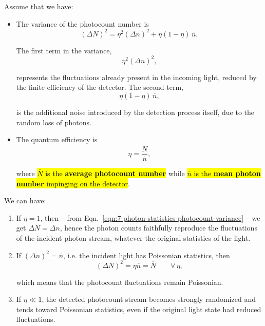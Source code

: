 Assume that we have:
\begin{itemize}
    \item The variance of the photocount number is
    \begin{equation}\label{eqn:7-photon-statistics-photocount-variance}
    (\Delta N)^2 = \eta^2 (\Delta n)^2 + \eta(1-\eta)\,\overline{n},
    \end{equation}

    The first term in the variance,
    \[
    \eta^2 (\Delta n)^2,
    \]

    represents the fluctuations already present in the incoming light, reduced by the finite efficiency of the detector. The second term,
    \[
    \eta(1-\eta)\,\overline{n},
    \]

    is the additional noise introduced by the detection process itself, due to the random loss of photons. 

    \item The quantum efficiency is
    \[
    \eta = \frac{\overline{N}}{\overline{n}},
    \]

    where \hl{$\overline{N}$ is the \textbf{average photocount number}} while \hl{$\overline{n}$ is the \textbf{mean photon number} impinging on the detector}.
\end{itemize}

We can have:

\begin{enumerate}
    \item If $\eta = 1$, then -- from Eqn.~\ref{eqn:7-photon-statistics-photocount-variance} -- we get $\Delta N = \Delta n$, hence the photon counts faithfully reproduce the fluctuations of the incident photon stream, whatever the original statistics of the light.
    
    \item If $(\Delta n)^2 = \overline{n}$, i.e. the incident light has Poissonian statistics, then
    \[
    (\Delta N)^2 = \eta \overline{n} = \overline{N} \qquad \forall\, \eta,
    \]

    which means that the photocount fluctuations remain Poissonian.

    \item If $\eta \ll 1$, the detected photocount stream becomes strongly randomized and tends toward Poissonian statistics, even if the original light state had reduced fluctuations.
\end{enumerate}

